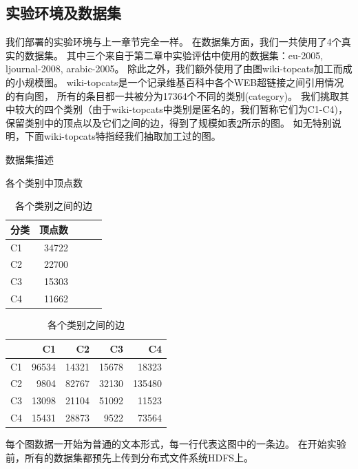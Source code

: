 \documentclass[master]{njuthesis}
\begin{document}
\subsection{实验环境及数据集}
我们部署的实验环境与上一章节完全一样。
在数据集方面，我们一共使用了4个真实的数据集。
其中三个来自于第二章中实验评估中使用的数据集：eu-2005, ljournal-2008, arabic-2005。
除此之外，我们额外使用了由图wiki-topcats\footnotemark[1]加工而成的小规模图。
wiki-topcats是一个记录维基百科中各个WEB超链接之间引用情况的有向图，
所有的条目都一共被分为17364个不同的类别(category)。
我们挑取其中较大的四个类别（由于wiki-topcats中类别是匿名的，我们暂称它们为C1-C4)，
保留类别中的顶点以及它们之间的边，得到了规模如表\ref{tab:dataset3}所示的图。
如无特别说明，下面wiki-topcats特指经我们抽取加工过的图。
\begin{table}[h]
\caption{数据集描述}
\label{tab:dataset3}
\centering
\begin{subtable}{.4\linewidth}
      \centering
        \caption{各个类别中顶点数}
       \begin{tabular}{|l|r|r|r|r|}
\hline
\textbf{分类} & \textbf{顶点数}  \\
\hline
C1 & \num{34722}     \\
\hline
C2 & \num{22700}     \\
\hline
C3 & \num{15303}     \\
\hline
C4 & \num{11662}     \\
\hline
\end{tabular}
    \end{subtable}%
   \begin{subtable}{.6\linewidth}
      \centering
        \caption{各个类别之间的边}
       \begin{tabular}{|l|r|r|r|r|}
\hline
 & \textbf{C1} & \textbf{C2} & \textbf{C3} & \textbf{C4} \\
\hline
C1 & \num{96534} &  \num{14321} & \num{15678}   & \num{18323} \\
\hline
C2 & \num{9804}  & \num{82767}& \num{32130} &\num{135480} \\
\hline
C3 & \num{13098}  &\num{21104} &\num{51092}  &\num{11523}\\
\hline
C4 & \num{15431}   & \num{28873}& \num{9522} & \num{73564}\\
\hline
\end{tabular}
    \end{subtable}%
\end{table}

每个图数据一开始为普通的文本形式，每一行代表这图中的一条边。
在开始实验前，所有的数据集都预先上传到分布式文件系统HDFS上。
\end{document}
